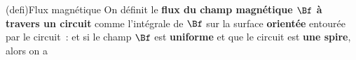 \documentclass[../../main/main.tex]{subfiles}
\begin{document}
\begin{tcb*}[sidebyside, righthand ratio=.4](defi){Flux magnétique}
	On définit le \textbf{flux du champ magnétique $\Bf$ à travers un circuit}
	comme l'intégrale de $\Bf$ sur la surface \textbf{orientée} entourée par le
	circuit~:
	\psw{%
		\[
			\F_S(\vv{B}) = \iint _{\Mr \in S}^{} \dd{\F(\Mr)} = \iint _{\Mr \in S}^{}
			\vv{B}(\Mr)\cdot \dd{\vv{S}(\Mr)}
		\]
	}%
	et si le champ $\Bf$ est \textbf{uniforme} et que le circuit est
	\textbf{une spire}, alors on a
	\psw{%
		\[
			\F_S(\Bf) = \Bf \cdot \vv{S}
			\quad \Ra \quad
			\F_{N~\text{spires}}(\Bf) = N\F_S(\Bf) = N \Bf \cdot \vv{S}
		\]
	}%
	\tcblower
	\begin{center}
\end{center}
\end{tcb*}
\end{document}
